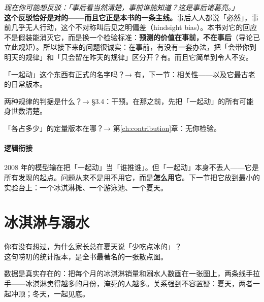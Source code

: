 \documentclass[../../main2.tex]{subfiles}
\begin{document}

	\begin{questionbox}
		\textit{现在你可能想反驳：「事后看当然清楚，事前谁能知道？这是事后诸葛亮。」}\\
		\textbf{这个反驳恰好是对的——而且它正是本书的一条主线。}事后人人都说「必然」，事前几乎无人行动，这个不对称叫后见之明偏差（hindsight bias）。本书对它的回应不是假装能消灭它，而是换一个检验标准：\textbf{预测的价值在事前，不在事后}（导论已立此规矩）。所以接下来的问题很诚实：在事前，有没有一套办法，把「会带你到明天的规律」和「只会留在昨天的规律」区分开？有。而且它简单到令人不安。
	\end{questionbox}

	\begin{reader_anticipation}
		\item 「一起动」这个东西有正式的名字吗？→ 有，下一节：相关性——以及它最古老的日常版本。
		\item 两种规律的判据是什么？→ §3.4：干预。在那之前，先把「一起动」的所有可能身世数清楚。
		\item 「各占多少」的定量版本在哪？→ 第\ref{ch:contribution}章：无你检验。
	\end{reader_anticipation}

	\paragraph*{逻辑衔接}
	2008 年的模型输在把「一起动」当「谁推谁」。但「一起动」本身不丢人——它是所有发现的起点。问题从来不是用不用它，而是\textbf{怎么用它}。下一节把它放到最小的实验台上：一个冰淇淋摊、一个游泳池、一个夏天。

	\section{冰淇淋与溺水}
	\label{sec:pred-correlation}

	\begin{readingnote}
		你有没有想过，为什么家长总在夏天说「少吃点冰的」？\\
		这句唠叨的统计版本，是全书最著名的一张散点图。
	\end{readingnote}

	数据是真实存在的：把每个月的冰淇淋销量和溺水人数画在一张图上，两条线手拉手——冰淇淋卖得越多的月份，淹死的人越多。关系强到不容置疑：夏天，两者一起冲顶；冬天，一起见底。
\end{document}
